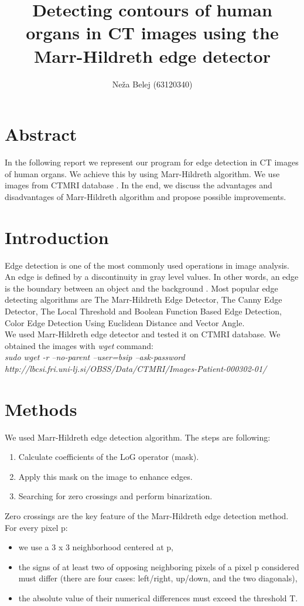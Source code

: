 \documentclass[a4paper,10pt]{article}
\title{Detecting contours of human organs in CT images using the Marr-Hildreth edge detector}
\author{Neža Belej (63120340)}
\begin{document}
\maketitle
\section {Abstract}
In the following report we represent our program for edge detection in CT images of human organs. We achieve this by using Marr-Hildreth algorithm. We use images from CTMRI database \cite{db}. In the end, we discuss the advantages and disadvantages of Marr-Hildreth algorithm and propose possible improvements.
\section{Introduction}
Edge detection is one of the most commonly used operations in image analysis. An edge is defined by a
discontinuity in gray level values. In other words, an edge is the boundary between an object and the background \cite{article1}. Most popular edge detecting algorithms are The Marr-Hildreth Edge Detector, The Canny Edge Detector, The Local Threshold and Boolean Function Based Edge Detection, Color Edge Detection Using Euclidean Distance and Vector Angle. \cite{article2}
\\
We used Marr-Hildreth edge detector and tested it on CTMRI database. We obtained the images with \textit{wget} command: \\

\textit{sudo wget -r --no-parent --user=bsip --ask-password \\ http://lbcsi.fri.uni-lj.si/OBSS/Data/CTMRI/Images-Patient-000302-01/}

\section{Methods}

We used Marr-Hildreth edge detection algorithm. The steps are following:
\begin{enumerate}
\item{Calculate coefficients of the LoG operator (mask).}
\item{Apply this mask on the image to enhance edges.}
\item{Searching for zero crossings and perform binarization.}
\end{enumerate}

Zero crossings are the key feature of the Marr-Hildreth edge detection method. For every pixel p:
\begin{itemize}
\item{we use a 3 x 3 neighborhood centered at p,}
\item{ the signs of at least two of opposing neighboring pixels of a pixel p considered must differ (there are four cases: left/right, up/down, and the two diagonals),}
\item{ the absolute value of their numerical differences must exceed the threshold T.}
\end{itemize}
\end{document}
